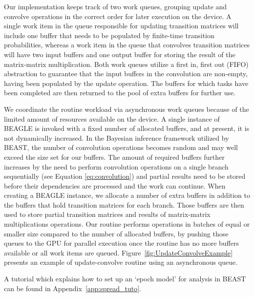 Our implementation keeps track of two work queues, grouping update and convolve operations in the correct order for later execution on the device. 
A single work item in the queue responsible for updating transition matrices will include one buffer that needs to be populated by finite-time transition probabilities, whereas a work item in the queue that convolves transition matrices will have two input buffers and one output buffer for storing the result of the matrix-matrix multiplication. 
Both work queues utilize a first in, first out (FIFO) abstraction 
to guarantee that the input buffers in the convolution are non-empty, having  been populated by the update operation. 
The buffers for which tasks have been completed are then returned to the pool of extra buffers for further use.

We coordinate the routine workload via asynchronous work queues because of the limited amount of resources available on the device. A single instance of BEAGLE is invoked with a fixed number of allocated buffers, and at present, it is not dynamically increased.
In the Bayesian inference framework utilized by BEAST, the number of convolution operations becomes random and may well exceed the size set for our buffers.
The amount of required buffers further increases by the need to perform convolution operations on a single branch sequentially  
(see Equation \ref{eq:convolution}) and partial results need to be stored before their dependencies are processed and the work can continue. 
When creating a BEAGLE instance, we allocate a number of extra buffers in addition to the buffers that hold transition matrices for each branch. 
Those buffers are then used to store partial transition matrices and results of matrix-matrix multiplications operations. 
Our routine performs operations in batches of equal or smaller size compared to the number of allocated buffers, by pushing those queues to the GPU for parallel execution once the routine has no more buffers available or all work items are queued. Figure~\ref{fig:UpdateConvolveExample} presents an example of update-convolve routine using an asynchronous queue. 

A tutorial which explains how to set up an `epoch model' for analysis in BEAST can be found in Appendix~\ref{app:spread_tuto}.

